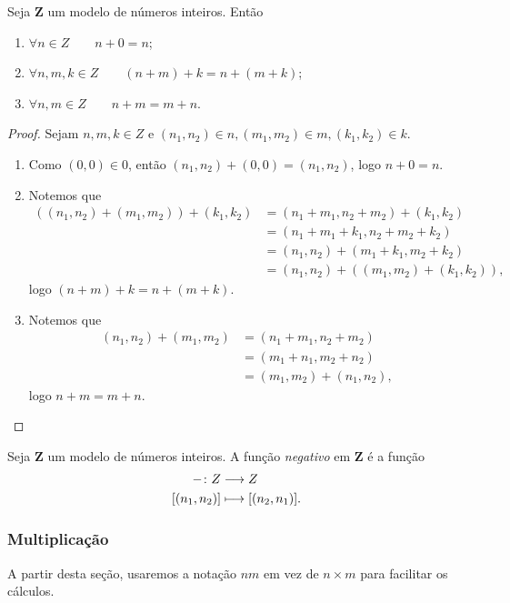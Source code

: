 \begin{proposition}
	Seja $\bm Z$ um modelo de números inteiros. Então
	\begin{enumerate}
	\item $\forall n \in Z \qquad n+0=n$;
	\item $\forall n,m,k \in Z \qquad (n+m)+k=n+(m+k)$;
	\item $\forall n,m \in Z \qquad n+m=m+n$.
	\end{enumerate}
\end{proposition}
\begin{proof} Sejam $n,m,k \in Z$ e $(n_1,n_2) \in n,(m_1,m_2) \in m,(k_1,k_2) \in k$.
	\begin{enumerate}
	\item Como $(0,0) \in 0$, então $(n_1,n_2)+(0,0)=(n_1,n_2)$, logo $n+0=n$.
	
	\item Notemos que
	\begin{align*}
	((n_1,n_2)+(m_1,m_2))+(k_1,k_2) &= (n_1+m_1,n_2+m_2)+(k_1,k_2) \\
		&= (n_1+m_1+k_1,n_2+m_2+k_2) \\
		&= (n_1,n_2) +(m_1+k_1,m_2+k_2) \\
		&= (n_1,n_2) +((m_1,m_2)+(k_1,k_2)),
	\end{align*}
logo $(n+m)+k=n+(m+k)$.

	\item Notemos que
	\begin{align*}
	(n_1,n_2)+(m_1,m_2) &= (n_1+m_1,n_2+m_2) \\
	&= (m_1+n_1,m_2+n_2) \\
	&= (m_1,m_2) +(n_1,n_2),
	\end{align*}
logo $n+m=m+n$.
	\end{enumerate}
\end{proof}

\begin{definition}
	Seja $\bm Z$ um modelo de números inteiros. A função \emph{negativo} em $\bm Z$ é a função
	\begin{align*}
	{-}\colon {Z} &\longrightarrow {Z} \\{[(n_1,n_2)]} &\longmapsto [(n_2,n_1)].
	\end{align*}
\end{definition}


\subsubsection{Multiplicação}

A partir desta seção, usaremos a notação $nm$ em vez de $n \times m$ para facilitar os cálculos.

